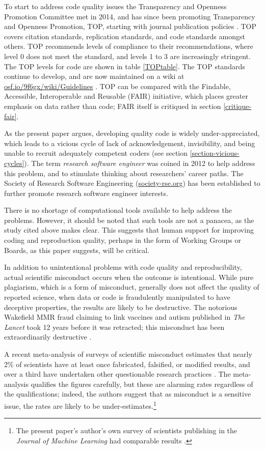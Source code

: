 \documentclass{comjnl}
\begin{document}
To start to address code quality issues the Transparency and Openness Promotion Committee met in 2014, and has since been promoting Transparency and Openness Promotion, TOP, starting with journal publication policies \cite{TOP}. TOP covers citation standards, replication standards, and code standards amongst others. TOP recommends levels of compliance to their recommendations, where level 0 does not meet the standard, and levels 1 to 3 are increasingly stringent. The TOP levels for code are shown in table \ref{TOPtable}. The TOP standards continue to develop, and are now maintained on a wiki at \url{osf.io/9f6gx/wiki/Guidelines} \cite{TOP-wiki}. TOP can be compared with the Findable, Accessible, Interoperable and Reusable (FAIR) initiative, which places greater emphasis on data rather than code; FAIR itself is critiqued in section \ref{critique-fair}.

As the present paper argues, developing quality code is widely under-appreciated, which leads to a vicious cycle of lack of acknowledgement, invisibility, and being unable to recruit adequately competent coders (see section \ref{section-vicious-cycles}). The term \emph{research software engineer\/} was coined in 2012 to help address this problem, and to stimulate thinking about researchers' career paths. The Society of Research Software Engineering (\url{society-rse.org}) has been established to further promote research software engineer interests.  

There is no shortage of computational tools available to help address the problems. However, it should be noted that such tools are not a panacea, as the study \cite{jupyter-study} cited above makes clear. This suggests that human support for improving coding and reproduction quality, perhaps in the form of Working Groups or Boards, as this paper suggests, will be critical.

In addition to unintentional problems with code quality and reproducibility, actual scientific misconduct occurs when the outcome is intentional. While pure plagiarism, which is a form of misconduct, generally does not affect the quality of reported science, when data or code is fraudulently manipulated to have deceptive properties, the results are likely to be destructive. The notorious Wakefield MMR fraud claiming to link vaccines and autism published in \emph{The Lancet\/} took 12 years before it was retracted; this misconduct has been extraordinarily destructive \cite{MMR-fraud}. 

A recent meta-analysis of surveys of scientific misconduct estimates that nearly 2\% of scientists have at least once fabricated, falsified, or modified results, and over a third have undertaken other questionable research practices \cite{misconduct-issues}. The meta-analysis qualifies the figures carefully, but these are alarming rates regardless of the qualifications; indeed, the authors suggest that as misconduct is a sensitive issue, the rates are likely to be under-estimates.\footnote{The present paper's author's own survey of scientists publishing in the \emph{Journal of Machine Learning\/} had comparable results \cite{machine-learning-reproducibility}.} 
\end{document}
